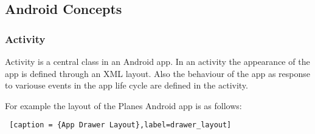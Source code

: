 \subsection { Android Concepts }

\subsubsection { Activity }

Activity is a central class in an Android app. In an activity the appearance of the app is defined through an XML layout. Also the behaviour of the app as response to variouse events in the app life cycle are defined in the activity.

For example the layout of the Planes Android app is as follows:

\begin{lstlisting} [caption = {App Drawer Layout},label=drawer_layout]


\end{lstlisting}
